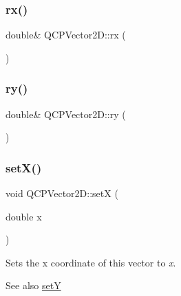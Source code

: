 \subsubsection{\texorpdfstring{rx()}{rx()}}
{\footnotesize\ttfamily double\& Q\+C\+P\+Vector2\+D\+::rx (\begin{DoxyParamCaption}{ }\end{DoxyParamCaption})\hspace{0.3cm}{\ttfamily [inline]}}

\mbox{\label{class_q_c_p_vector2_d_aa8f59a5b54aec8be8e4d1f39db892fea}} 
\subsubsection{\texorpdfstring{ry()}{ry()}}
{\footnotesize\ttfamily double\& Q\+C\+P\+Vector2\+D\+::ry (\begin{DoxyParamCaption}{ }\end{DoxyParamCaption})\hspace{0.3cm}{\ttfamily [inline]}}

\mbox{\label{class_q_c_p_vector2_d_ab4249e6ce7bfc37be56f014c54b761ae}} 
\subsubsection{\texorpdfstring{set\+X()}{setX()}}
{\footnotesize\ttfamily void Q\+C\+P\+Vector2\+D\+::setX (\begin{DoxyParamCaption}\item[{double}]{x }\end{DoxyParamCaption})\hspace{0.3cm}{\ttfamily [inline]}}

Sets the x coordinate of this vector to {\itshape x}.

\begin{DoxySeeAlso}{See also}
\hyperlink{class_q_c_p_vector2_d_ada288019aa8cd51e3b30acfc07b461dc}{setY} 
\end{DoxySeeAlso}
\mbox{\label{class_q_c_p_vector2_d_ada288019aa8cd51e3b30acfc07b461dc}} 
